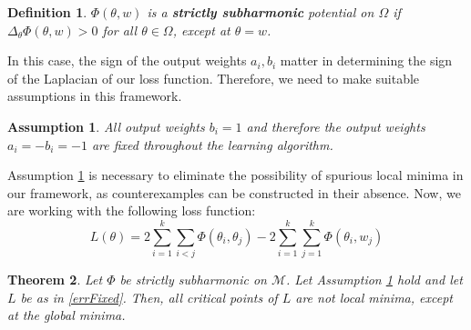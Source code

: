 \documentclass{article}
\newtheorem{theorem}{Theorem}[section]
\newtheorem{definition}[theorem]{Definition}
\newtheorem{assumption}{Assumption}
\begin{document}
\begin{definition}
$\Phi(\theta,w)$ is a {\bf strictly subharmonic} potential on $\Omega$ if $\Delta_\theta \Phi(\theta,w) > 0$ for all $\theta \in \Omega$, except at $\theta = w$.
\end{definition}


In this case, the sign of the output weights $a_i, b_i$ matter in determining the sign of the Laplacian of our loss function. Therefore, we need to make suitable assumptions in this framework.

\begin{assumption}
\label{outputFixed}
All output weights $b_i = 1$ and therefore the output weights  $a_i = - b_i = -1$ are fixed throughout the learning algorithm. 
\end{assumption}

Assumption \ref{outputFixed} is necessary to eliminate the possibility of spurious local minima in our framework, as counterexamples can be constructed in their absence. Now, we are working with the following loss function:
\begin{equation}\label{errFixed}
L(\theta) =  2\sum_{i=1}^k\sum_{i < j} \Phi(\theta_i,\theta_j) - 2\sum_{i=1}^k\sum_{j=1}^k\Phi(\theta_i,w_j)
\end{equation}
\begin{theorem}\label{subStrict}
Let $\Phi$ be strictly subharmonic on $\mathcal{M}$. Let Assumption \ref{outputFixed} hold and let $L$ be as in \eqref{errFixed}. Then, all critical points of $L$ are not local minima, except at the global minima. 
\end{theorem}
\end{document}
